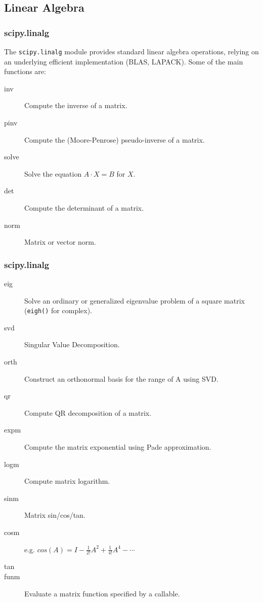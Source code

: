 \documentclass[10pt,colorlinks]{beamer}
\begin{document}
\subsection{Linear Algebra}
\begin{frame}[fragile]\frametitle{scipy.linalg}
  \begin{block}{}
    The \verb|scipy.linalg| module provides standard linear algebra operations, relying on an underlying efficient implementation (BLAS, LAPACK). Some of the main functions are:
  \end{block}
\begin{description}
    \item[inv] Compute the inverse of a matrix.
    \item[pinv] Compute the (Moore-Penrose) pseudo-inverse of a matrix.
    \item[solve] Solve the equation $A\cdot X  = B$  for $X$. 
    \item[det]  Compute the determinant of a matrix.
    \item[norm] Matrix or vector norm.
\end{description}
\end{frame}

\begin{frame}[fragile]\frametitle{scipy.linalg}
  \begin{description}
      \item[eig] Solve an ordinary or generalized eigenvalue problem of a square matrix (\verb|eigh()| for complex).
    \item[svd] Singular Value Decomposition.
    \item[orth] Construct an orthonormal basis for the range of A using SVD.
    \item[qr] Compute QR decomposition of a matrix.
    \item[expm] Compute the matrix exponential using Pade approximation. 
    \item[logm] Compute matrix logarithm.
    \item[sinm] Matrix sin/cos/tan. 
    \item[cosm] e.g. $cos(A) = I - \frac{1}{2!}A^2 + \frac{1}{4!}A^4 - \cdots $
    \item[tan]
    \item[funm] Evaluate a matrix function specified by a callable.
  \end{description}
\end{frame}
\end{document}
